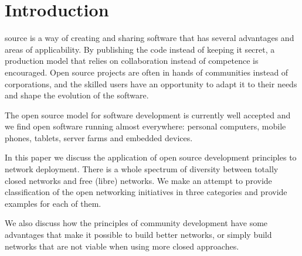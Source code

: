 \documentclass[journal]{IEEEtran}
\begin{document}
%
\IEEEpeerreviewmaketitle



\section{Introduction}
% 
% 
% 
% 
 source is a way of creating and sharing software that has several advantages and areas of applicability.
By publishing the code instead of keeping it secret, a production model that relies on collaboration instead of competence is encouraged.
Open source projects are often in hands of communities instead of corporations, and the skilled users have an opportunity to adapt it to their needs and shape the evolution of the software.

The open source model for software development is currently well accepted and we find open software running almost everywhere: personal computers, mobile phones, tablets, server farms and embedded devices.

In this paper we discuss the application of open source development principles to network deployment.
There is a whole spectrum of diversity between totally closed networks and free (libre) networks.
We make an attempt to provide classification of the open networking initiatives in three categories and provide examples for each of them.

We also discuss how the principles of community development have some advantages that make it possible to build better networks, or simply build networks that are not viable when using more closed approaches.
\end{document}
